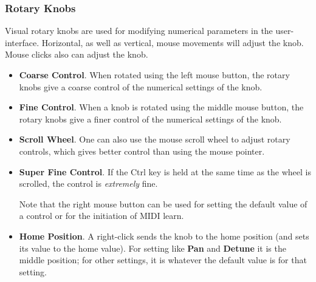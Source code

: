 \subsubsection{Rotary Knobs}
\label{subsubsec:stock_settings_elements_knobs}

   Visual rotary knobs are used for modifying numerical parameters in the
   user-interface.
   Horizontal, as well as vertical, mouse movements will adjust the knob.
   Mouse clicks also can adjust the knob.

   \begin{itemize}

      \item \textbf{Coarse Control}.
         When rotated using the left mouse button, the rotary knobs give a
         coarse control of the numerical settings of the knob.

      \item \textbf{Fine Control}.
         When a knob is rotated using the middle mouse button, the rotary knobs
         give a finer control of the numerical settings of the knob.

      \item \textbf{Scroll Wheel}.
         One can also use the mouse scroll wheel to adjust rotary controls,
         which gives better control than using the mouse pointer.

      \item \textbf{Super Fine Control}.
         If the Ctrl key is held at the same time as the wheel is scrolled, the
         control is \textsl{extremely} fine.

   Note that the right mouse button can be used for setting the default value of a
   control or for the initiation of
   MIDI learn.


      \item \textbf{Home Position}.
         A right-click sends the knob to the home position (and sets its value
         to the home value). For setting like \textbf{Pan} and
         \textbf{Detune} it is the middle position; for other settings,
         it is whatever the default value is for that setting.

   \end{itemize}

